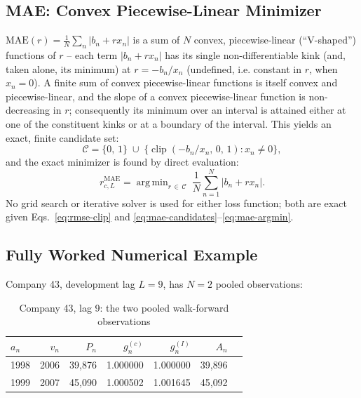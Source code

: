 \documentclass[11pt]{article}
\newcommand{\rmae}{r^{\text{MAE}}}
\DeclareMathOperator*{\argmin}{arg\,min}
\begin{document}
\subsection{MAE: Convex Piecewise-Linear Minimizer}

$\text{MAE}(r) = \tfrac{1}{N}\sum_n |b_n + r x_n|$ is a sum of $N$ convex, piecewise-linear
(``V-shaped'') functions of $r$ -- each term $|b_n + r x_n|$ has its single non-differentiable
kink (and, taken alone, its minimum) at $r = -b_n/x_n$ (undefined, i.e. constant in $r$, when
$x_n=0$). A finite sum of convex piecewise-linear functions is itself convex and piecewise-linear,
and the slope of a convex piecewise-linear function is non-decreasing in $r$; consequently its
minimum over an interval is attained either at one of the constituent kinks or at a boundary of
the interval. This yields an exact, finite candidate set:
\begin{equation}
\mathcal{C} = \{0,\,1\} \;\cup\; \bigl\{\operatorname{clip}(-b_n/x_n,\,0,\,1) : x_n \ne 0\bigr\},
\label{eq:mae-candidates}
\end{equation}
and the exact minimizer is found by direct evaluation:
\begin{equation}
\rmae_{c,L} = \argmin_{r\, \in\, \mathcal{C}} \ \frac{1}{N}\sum_{n=1}^N \bigl|b_n + r x_n\bigr|.
\label{eq:mae-argmin}
\end{equation}
No grid search or iterative solver is used for either loss function; both are exact given
Eqs.~\eqref{eq:rmse-clip} and \eqref{eq:mae-candidates}--\eqref{eq:mae-argmin}.

\subsection{Fully Worked Numerical Example}
\label{sec:worked-example}

Company 43, development lag $L=9$, has $N=2$ pooled observations:

\begin{table}[h]
\centering
\caption{Company 43, lag 9: the two pooled walk-forward observations}
\begin{tabular}{lrrrrrr}
\toprule
$a_n$ & $v_n$ & $P_n$ & $g^{(c)}_n$ & $g^{(I)}_n$ & $A_n$ & \\
\midrule
1998 & 2006 & 39{,}876 & 1.000000 & 1.000000 & 39{,}896 & \\
1999 & 2007 & 45{,}090 & 1.000502 & 1.001645 & 45{,}092 & \\
\bottomrule
\end{tabular}
\end{table}
\end{document}
